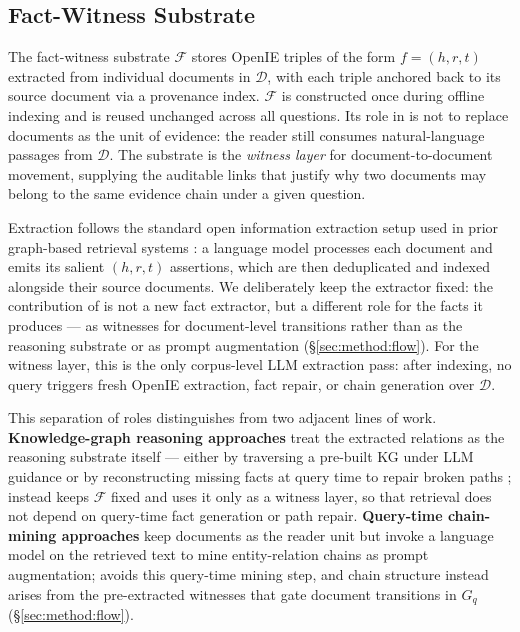 \subsection{Fact-Witness Substrate}
\label{sec:method:substrate}

The fact-witness substrate $\mathcal{F}$ stores OpenIE triples of the form
$f = (h, r, t)$ extracted from individual documents in $\mathcal{D}$, with
each triple anchored back to its source document via a provenance index.
$\mathcal{F}$ is constructed once during offline indexing and is reused
unchanged across all questions. Its role in \methodname{} is not to replace
documents as the unit of evidence: the reader still consumes natural-language
passages from $\mathcal{D}$. The substrate is the \emph{witness layer} for
document-to-document movement, supplying the auditable links that justify
why two documents may belong to the same evidence chain under a given
question.

Extraction follows the standard open information extraction setup used in
prior graph-based retrieval systems
\citep{angeli2015leveraging,gutierrez2025hipporag}: a language model
processes each document and emits its salient $(h, r, t)$ assertions, which
are then deduplicated and indexed alongside their source documents. We
deliberately keep the extractor fixed: the contribution of \methodname{} is
not a new fact extractor, but a different role for the facts it produces
--- as witnesses for document-level transitions rather than as the
reasoning substrate or as prompt augmentation (\S\ref{sec:method:flow}).
For the witness layer, this is the only corpus-level LLM extraction pass:
after indexing, no query triggers fresh OpenIE extraction, fact repair, or
chain generation over $\mathcal{D}$.

This separation of roles distinguishes \methodname{} from two adjacent
lines of work. \textbf{Knowledge-graph reasoning approaches}
\citep{sun2024tog,huang2026relink} treat the extracted relations as the
reasoning substrate itself --- either by traversing a pre-built KG under
LLM guidance \citep{sun2024tog} or by reconstructing missing facts at query
time to repair broken paths \citep{huang2026relink}; \methodname{} instead
keeps $\mathcal{F}$ fixed and uses it only as a witness layer, so that
retrieval does not depend on query-time fact generation or path repair.
\textbf{Query-time chain-mining approaches} \citep{peng2026neocorrag} keep
documents as the reader unit but invoke a language model on the retrieved
text to mine entity-relation chains as prompt augmentation; \methodname{}
avoids this query-time mining step, and chain structure instead arises
from the pre-extracted witnesses that gate document transitions in $G_q$
(\S\ref{sec:method:flow}).

